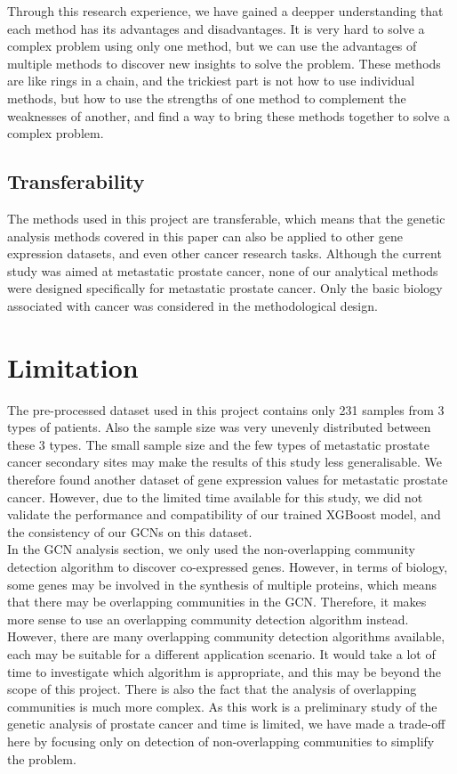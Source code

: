 \documentclass[12pt,a4paper]{report}
\begin{document}
Through this research experience, we have gained a deepper understanding that each method has its advantages and disadvantages. It is very hard to solve a complex problem using only one method, but we can use the advantages of multiple methods to discover new insights to solve the problem. These methods are like rings in a chain, and the trickiest part is not how to use individual methods, but how to use the strengths of one method to complement the weaknesses of another, and find a way to bring these methods together to solve a complex problem.\\

\subsection{Transferability}
The methods used in this project are transferable, which means that the genetic analysis methods covered in this paper can also be applied to other gene expression datasets, and even other cancer research tasks. Although the current study was aimed at metastatic prostate cancer, none of our analytical methods were designed specifically for metastatic prostate cancer. Only the basic biology associated with cancer was considered in the methodological design.

\section{Limitation}
The pre-processed dataset used in this project contains only 231 samples from 3 types of patients. Also the sample size was very unevenly distributed between these 3 types. The small sample size and the few types of metastatic prostate cancer secondary sites may make the results of this study less generalisable. We therefore found another dataset of gene expression values for metastatic prostate cancer. However, due to the limited time available for this study, we did not validate the performance and compatibility of our trained XGBoost model, and the consistency of our GCNs on this dataset.\\

In the GCN analysis section, we only used the non-overlapping community detection algorithm to discover co-expressed genes. However, in terms of biology, some genes may be involved in the synthesis of multiple proteins, which means that there may be overlapping communities in the GCN. Therefore, it makes more sense to use an overlapping community detection algorithm instead. However, there are many overlapping community detection algorithms available, each may be suitable for a different application scenario. It would take a lot of time to investigate which algorithm is appropriate, and this may be beyond the scope of this project. There is also the fact that the analysis of overlapping communities is much more complex. As this work is a preliminary study of the genetic analysis of prostate cancer and time is limited, we have made a trade-off here by focusing only on detection of non-overlapping communities to simplify the problem.\\
\end{document}
